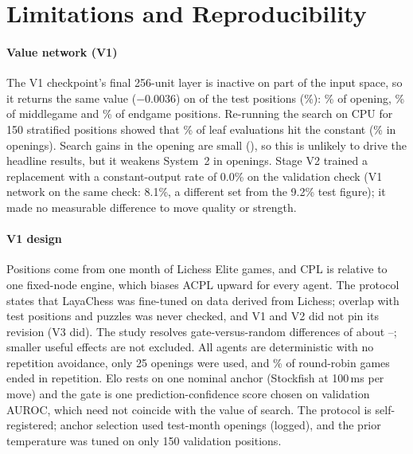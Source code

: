 \section{Limitations and Reproducibility}
\label{sec:limits}
\paragraph*{Value network (V1)}
The V1 checkpoint's final 256-unit layer is inactive on part of the input space, so it returns the same value ($-0.0036$) on \constN{} of the \nPos{} test positions (\constPct\%): \constOpen\% of opening, \constMid\% of middlegame and \constEnd\% of endgame positions. Re-running the search on CPU for 150 stratified positions showed that \saAll\% of leaf evaluations hit the constant (\saOpen\% in openings). Search gains in the opening are small (\gainOpen\cp), so this is unlikely to drive the headline results, but it weakens System~2 in openings. Stage V2 trained a replacement with a constant-output rate of 0.0\% on the validation check (V1 network on the same check: 8.1\%, a different set from the 9.2\% test figure); it made no measurable difference to move quality or strength.

\paragraph*{V1 design}
Positions come from one month of Lichess Elite games, and CPL is relative to one fixed-node engine, which biases ACPL upward for every agent. The protocol states that LayaChess was fine-tuned on data derived from Lichess; overlap with test positions and puzzles was never checked, and V1 and V2 did not pin its revision (V3 did). The study resolves gate-versus-random differences of about \mdeTen--\mdeFifty\cp; smaller useful effects are not excluded. All agents are deterministic with no repetition avoidance, only 25 openings were used, and \rrThreePct\% of round-robin games ended in repetition. Elo rests on one nominal anchor (Stockfish at 100\,ms per move) and the gate is one prediction-confidence score chosen on validation AUROC, which need not coincide with the value of search. The protocol is self-registered; anchor selection used test-month openings (logged), and the prior temperature was tuned on only 150 validation positions.

